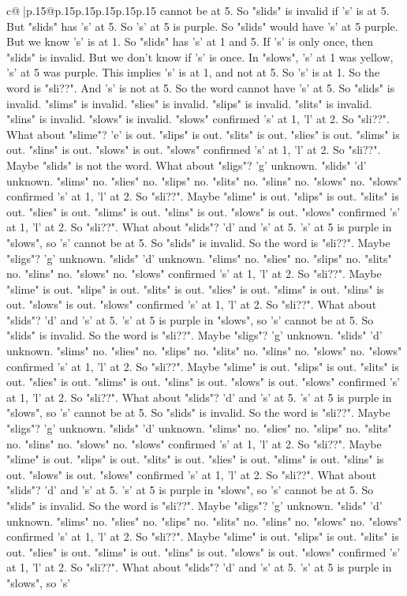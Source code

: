 \documentclass{article}
\begin{document}
{\begin{supertabular}{c@{$\;$}|p{.15\linewidth}@{}p{.15\linewidth}p{.15\linewidth}p{.15\linewidth}p{.15\linewidth}p{.15\linewidth}}
{{{cannot be at 5. So "slids" is invalid if 's' is at 5. But "slids" has 's' at 5. So 's' at 5 is purple. So "slids" would have 's' at 5 purple. But we know 's' is at 1. So "slids" has 's' at 1 and 5. If 's' is only once, then "slids" is invalid. But we don't know if 's' is once. In "slows", 's' at 1 was yellow, 's' at 5 was purple. This implies 's' is at 1, and not at 5. So 's' is at 1. So the word is "sli??". And 's' is not at 5. So the word cannot have 's' at 5. So "slids" is invalid. "slims" is invalid. "slies" is invalid. "slips" is invalid. "slits" is invalid. "slins" is invalid. "slows" is invalid. "slows" confirmed 's' at 1, 'l' at 2. So "sli??". What about "slime"? 'e' is out. "slips" is out. "slits" is out. "slies" is out. "slims" is out. "slins" is out. "slows" is out. "slows" confirmed 's' at 1, 'l' at 2. So "sli??". Maybe "slids" is not the word. What about "sligs"? 'g' unknown. "slids" 'd' unknown. "slims" no. "slies" no. "slips" no. "slits" no. "slins" no. "slows" no. "slows" confirmed 's' at 1, 'l' at 2. So "sli??". Maybe "slime" is out. "slips" is out. "slits" is out. "slies" is out. "slims" is out. "slins" is out. "slows" is out. "slows" confirmed 's' at 1, 'l' at 2. So "sli??". What about "slids"? 'd' and 's' at 5. 's' at 5 is purple in "slows", so 's' cannot be at 5. So "slids" is invalid. So the word is "sli??". Maybe "sligs"? 'g' unknown. "slids" 'd' unknown. "slims" no. "slies" no. "slips" no. "slits" no. "slins" no. "slows" no. "slows" confirmed 's' at 1, 'l' at 2. So "sli??". Maybe "slime" is out. "slips" is out. "slits" is out. "slies" is out. "slims" is out. "slins" is out. "slows" is out. "slows" confirmed 's' at 1, 'l' at 2. So "sli??". What about "slids"? 'd' and 's' at 5. 's' at 5 is purple in "slows", so 's' cannot be at 5. So "slids" is invalid. So the word is "sli??". Maybe "sligs"? 'g' unknown. "slids" 'd' unknown. "slims" no. "slies" no. "slips" no. "slits" no. "slins" no. "slows" no. "slows" confirmed 's' at 1, 'l' at 2. So "sli??". Maybe "slime" is out. "slips" is out. "slits" is out. "slies" is out. "slims" is out. "slins" is out. "slows" is out. "slows" confirmed 's' at 1, 'l' at 2. So "sli??". What about "slids"? 'd' and 's' at 5. 's' at 5 is purple in "slows", so 's' cannot be at 5. So "slids" is invalid. So the word is "sli??". Maybe "sligs"? 'g' unknown. "slids" 'd' unknown. "slims" no. "slies" no. "slips" no. "slits" no. "slins" no. "slows" no. "slows" confirmed 's' at 1, 'l' at 2. So "sli??". Maybe "slime" is out. "slips" is out. "slits" is out. "slies" is out. "slims" is out. "slins" is out. "slows" is out. "slows" confirmed 's' at 1, 'l' at 2. So "sli??". What about "slids"? 'd' and 's' at 5. 's' at 5 is purple in "slows", so 's' cannot be at 5. So "slids" is invalid. So the word is "sli??". Maybe "sligs"? 'g' unknown. "slids" 'd' unknown. "slims" no. "slies" no. "slips" no. "slits" no. "slins" no. "slows" no. "slows" confirmed 's' at 1, 'l' at 2. So "sli??". Maybe "slime" is out. "slips" is out. "slits" is out. "slies" is out. "slims" is out. "slins" is out. "slows" is out. "slows" confirmed 's' at 1, 'l' at 2. So "sli??". What about "slids"? 'd' and 's' at 5. 's' at 5 is purple in "slows", so 's' }}}
\end{supertabular}}
\end{document}
